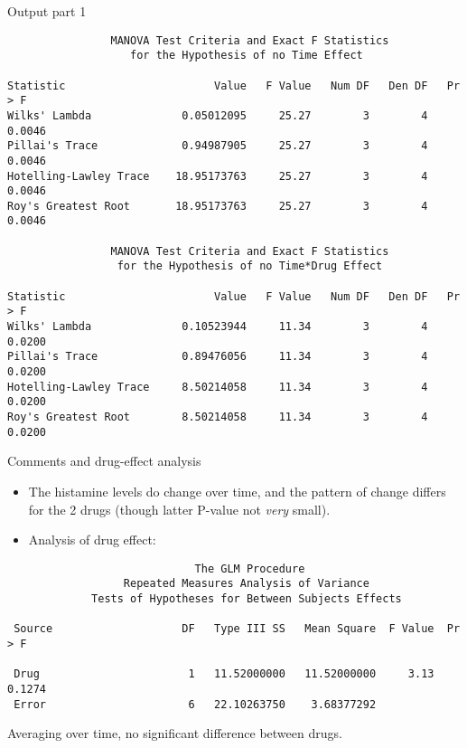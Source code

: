 \documentclass[pdf]{prosper}
\begin{document}
  \begin{slide}{Output part 1}

{\scriptsize
\begin{verbatim}
                MANOVA Test Criteria and Exact F Statistics
                   for the Hypothesis of no Time Effect

Statistic                       Value   F Value   Num DF   Den DF   Pr > F
Wilks' Lambda              0.05012095     25.27        3        4   0.0046
Pillai's Trace             0.94987905     25.27        3        4   0.0046
Hotelling-Lawley Trace    18.95173763     25.27        3        4   0.0046
Roy's Greatest Root       18.95173763     25.27        3        4   0.0046

                MANOVA Test Criteria and Exact F Statistics
                 for the Hypothesis of no Time*Drug Effect

Statistic                       Value   F Value   Num DF   Den DF   Pr > F
Wilks' Lambda              0.10523944     11.34        3        4   0.0200
Pillai's Trace             0.89476056     11.34        3        4   0.0200
Hotelling-Lawley Trace     8.50214058     11.34        3        4   0.0200
Roy's Greatest Root        8.50214058     11.34        3        4   0.0200

\end{verbatim}
}
    
  \end{slide}

  \begin{slide}{Comments and drug-effect analysis}

    \begin{itemize}
    \item The histamine levels do change over time, and the pattern of change differs for the 2 drugs (though latter P-value not {\em very} small).
    \item Analysis of drug effect:
    \end{itemize}

{\scriptsize
\begin{verbatim}
                             The GLM Procedure
                  Repeated Measures Analysis of Variance
             Tests of Hypotheses for Between Subjects Effects

 Source                    DF   Type III SS   Mean Square  F Value  Pr > F

 Drug                       1   11.52000000   11.52000000     3.13  0.1274
 Error                      6   22.10263750    3.68377292                 

\end{verbatim}
}

Averaging over time, no significant difference between drugs.

\end{slide}
\end{document}
